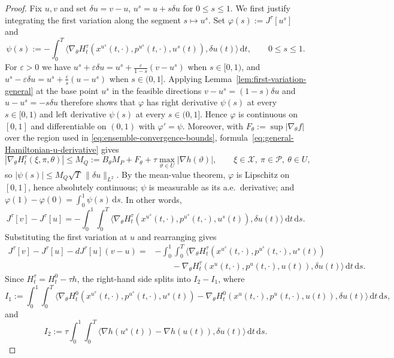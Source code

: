 \documentclass[11pt]{amsart}
\numberwithin{equation}{section} %
\newcommand{\dd}{\mathrm{d}}
\theoremstyle{remark}
\begin{document}
\begin{proof}
Fix $u,v$ and set $\delta u=v-u$, $u^s=u+s\delta u$ for
$0\le s\le1$.
We first justify integrating the first variation along the
segment $s\mapsto u^s$. Set $\varphi(s):=J^\tau[u^s]$ and
\[
\psi(s):=-\int_0^T
\langle \nabla_\theta H_t^\tau(x^{u^s}(t,\cdot),p^{u^s}(t,\cdot),u^s(t)),\delta u(t)\rangle\,\dd t,
\qquad 0\le s\le1.
\]
For $\varepsilon>0$ we have
$u^s+\varepsilon\delta u=u^s+\frac{\varepsilon}{1-s}(v-u^s)$ when
$s\in[0,1)$, and
$u^s-\varepsilon\delta u=u^s+\frac{\varepsilon}{s}(u-u^s)$ when
$s\in(0,1]$. Applying Lemma~\ref{lem:first-variation-general} at the
base point $u^s$ in the feasible directions $v-u^s=(1-s)\delta u$ and
$u-u^s=-s\delta u$ therefore shows that $\varphi$ has right derivative
$\psi(s)$ at every $s\in[0,1)$ and left derivative $\psi(s)$ at every
$s\in(0,1]$. Hence $\varphi$ is continuous on $[0,1]$ and
differentiable on $(0,1)$ with $\varphi'=\psi$. Moreover, with
$F_\theta:=\sup|\nabla_\theta f|$ over the region used in
\eqref{eq:ensemble-convergence-bounds},
formula~\eqref{eq:general-Hamiltonian-u-derivative} gives
\[
|\nabla_\theta H_t^\tau(\xi,\pi,\theta)|
\le M_Q:=B_\theta M_P+F_\theta+\tau\max_{\vartheta\in U}|\nabla h(\vartheta)|,
\qquad \xi\in\mathcal X,\ \pi\in\mathcal P,\ \theta\in U,
\]
so $|\psi(s)|\le M_Q\sqrt T\,\|\delta u\|_{L^2}$. By the mean-value
theorem, $\varphi$ is Lipschitz on $[0,1]$, hence absolutely
continuous; $\psi$ is measurable as its a.e.\ derivative; and
$\varphi(1)-\varphi(0)=\int_0^1\psi(s)\,\dd s$. In other words,
\begin{equation}
\label{eq:J-segment-integral}
J^\tau[v]-J^\tau[u]=-\int_0^1\int_0^T
\langle \nabla_\theta H_t^\tau(x^{u^s}(t,\cdot),p^{u^s}(t,\cdot),u^s(t)),\delta u(t)\rangle\,\dd t\,\dd s.
\end{equation}
Substituting the first variation at $u$ and rearranging gives
\begin{align*}
J^\tau[v]-J^\tau[u]-dJ^\tau[u](v-u) = &-\int_0^1\int_0^T
\langle \nabla_\theta H_t^\tau(x^{u^s}(t,\cdot),p^{u^s}(t,\cdot),u^s(t))\\
&\qquad-\nabla_\theta H_t^\tau(x^u(t,\cdot),p^u(t,\cdot),u(t)),\delta u(t)\rangle\,\dd t\,\dd s.
\end{align*}
Since $H_t^\tau=H_t^0-\tau h$, the right-hand side splits into $I_2 -I_1$, where
\[
I_1 := \int_0^1\int_0^T
\langle \nabla_\theta H_t^0(x^{u^s}(t,\cdot),p^{u^s}(t,\cdot),u^s(t))-\nabla_\theta H_t^0(x^u(t,\cdot),p^u(t,\cdot),u(t)),\delta u(t)\rangle\,\dd t\,\dd s,
\]
and
\[
I_2 := \tau \int_0^1\int_0^T
\langle \nabla h(u^s(t)) - \nabla h(u(t)), \delta u(t) \rangle \, \dd t \, \dd s.
\]
\end{proof}
\end{document}
